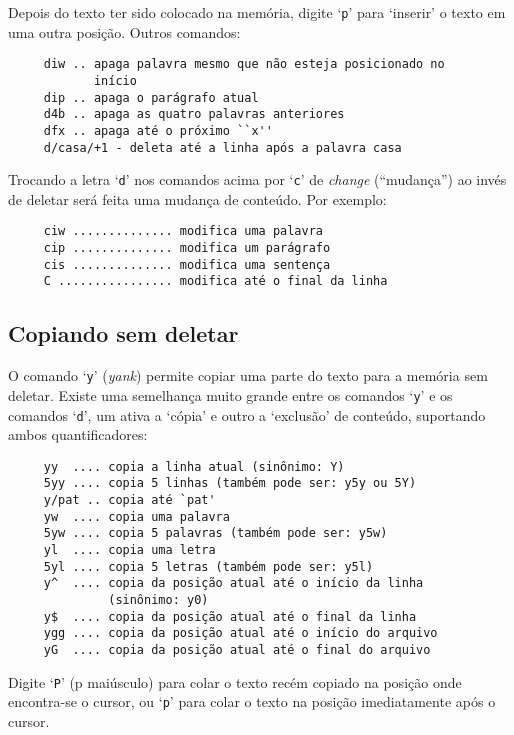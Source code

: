 Depois do texto ter sido colocado na memória, digite `{\tt p}' para `inserir' o
texto em uma outra posição. Outros comandos:

\begin{verbatim}
     diw .. apaga palavra mesmo que não esteja posicionado no 
            início
     dip .. apaga o parágrafo atual
     d4b .. apaga as quatro palavras anteriores
     dfx .. apaga até o próximo ``x''
     d/casa/+1 - deleta até a linha após a palavra casa
\end{verbatim}

Trocando a letra `{\tt d}' nos comandos acima por `{\tt c}' de {\em change}
(``mudança'') ao invés de deletar será feita uma mudança de conteúdo.  Por
exemplo:

\begin{verbatim}
     ciw .............. modifica uma palavra
     cip .............. modifica um parágrafo
     cis .............. modifica uma sentença
     C ................ modifica até o final da linha
\end{verbatim}

\subsection{Copiando sem deletar}\label{Copiando sem deletar}

O comando `{\tt y}' ({\em yank}) permite copiar uma parte do 
texto para a memória sem deletar.  Existe uma semelhança muito grande entre 
os comandos `{\tt y}' e os comandos `{\tt d}', um ativa a `cópia' e outro a 
`exclusão' de conteúdo, suportando ambos quantificadores:

\begin{verbatim}
     yy  .... copia a linha atual (sinônimo: Y)
     5yy .... copia 5 linhas (também pode ser: y5y ou 5Y)
     y/pat .. copia até `pat'
     yw  .... copia uma palavra
     5yw .... copia 5 palavras (também pode ser: y5w)
     yl  .... copia uma letra
     5yl .... copia 5 letras (também pode ser: y5l)
     y^  .... copia da posição atual até o início da linha
              (sinônimo: y0)
     y$  .... copia da posição atual até o final da linha
     ygg .... copia da posição atual até o início do arquivo
     yG  .... copia da posição atual até o final do arquivo
\end{verbatim}

Digite `{\tt P}' (p maiúsculo) para colar o texto recém copiado na
posição onde encontra-se o cursor, ou `{\tt p}' para colar o texto na posição 
imediatamente após o cursor.

